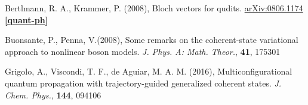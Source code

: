 \documentclass[12pt]{report}
\begin{document}
\begin{thebibliography}{10}
	Bertlmann, R. A., Krammer, P. (2008), Bloch vectors for qudits. \href{ 	
https://doi.org/10.48550/arXiv.0806.1174}{arXiv:0806.1174 \textbf{[quant-ph]}}

	Buonsante, P., Penna, V.(2008), Some remarks on the coherent-state variational approach to nonlinear boson models. \textit{J. Phys. A: Math. Theor.}, \textbf{41}, 175301
	
	Grigolo, A., Viscondi, T. F., de Aguiar, M. A. M. (2016), Multiconfigurational quantum propagation with trajectory-guided generalized coherent states. \textit{J. Chem. Phys.}, \textbf{144}, 094106

	\end{thebibliography}
	
	
	\appendix
	
	
	
	
	
	
	

	
	
\end{document}
